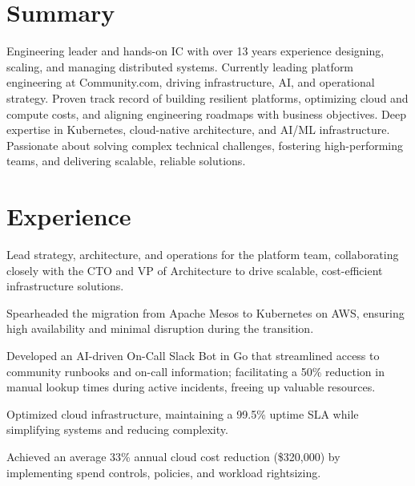 \documentclass[]{resume}
\begin{document}
%
%

%
%

\begin{minipage}[t]{0.65\textwidth}


\section{Summary}
Engineering leader and hands-on IC with over 13 years experience designing, scaling, and managing distributed systems. Currently leading platform engineering at Community.com, driving infrastructure, AI, and operational strategy. Proven track record of building resilient platforms, optimizing cloud and compute costs, and aligning engineering roadmaps with business objectives. Deep expertise in Kubernetes, cloud-native architecture, and AI/ML infrastructure. Passionate about solving complex technical challenges, fostering high-performing teams, and delivering scalable, reliable solutions.
\sectionsep

\section{Experience}
\vspace{\topsep} %
\begin{tightemize}
\item Lead strategy, architecture, and operations for the platform team, collaborating closely with the CTO and VP of Architecture to drive scalable, cost-efficient infrastructure solutions.
\item Spearheaded the migration from Apache Mesos to Kubernetes on AWS, ensuring high availability and minimal disruption during the transition.
\item Developed an AI-driven On-Call Slack Bot in Go that streamlined access to community runbooks and on-call information; facilitating a 50\% reduction in manual lookup times during active incidents, freeing up valuable resources.
\item Optimized cloud infrastructure, maintaining a 99.5\% uptime SLA while simplifying systems and reducing complexity.
\item Achieved an average 33\% annual cloud cost reduction (\$320,000) by implementing spend controls, policies, and workload rightsizing.
\end{tightemize}
\sectionsep


\end{minipage}
\end{document}
